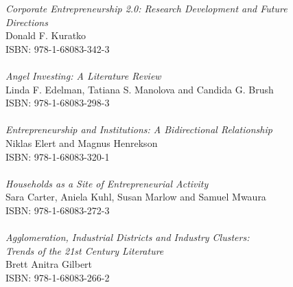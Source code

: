 \vspace{12pt}
\noindent \textit{Corporate Entrepreneurship 2.0: Research Development and Future\\ Directions}\\
Donald F. Kuratko\\
ISBN: 978-1-68083-342-3\\
\\
\noindent \textit{Angel Investing: A Literature Review}\\
Linda F. Edelman, Tatiana S. Manolova and Candida G. Brush\\
ISBN: 978-1-68083-298-3\\
\\
\noindent \textit{Entrepreneurship and Institutions: A Bidirectional Relationship}\\
Niklas Elert and Magnus Henrekson\\
ISBN: 978-1-68083-320-1\\
\\
\noindent \textit{Households as a Site of Entrepreneurial Activity}\\
Sara Carter, Aniela Kuhl, Susan Marlow and Samuel Mwaura\\
ISBN: 978-1-68083-272-3\\
\\
\noindent \textit{Agglomeration, Industrial Districts and Industry Clusters:\\ Trends of the 21st Century Literature }\\
Brett Anitra Gilbert\\
ISBN: 978-1-68083-266-2\\
